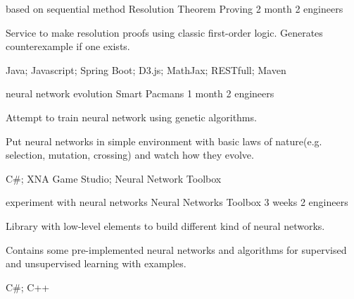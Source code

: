 \begin{cventries}
  \cventry
    {based on sequential method}
    {Resolution Theorem Proving}
    {2 month}
    {2 engineers}
    {
      \begin{cvitems}
        \item {Service to make resolution proofs using classic first-order logic. Generates counterexample if one exists.}
        \item {Java; Javascript; Spring Boot; D3.js; MathJax; RESTfull; Maven}
      \end{cvitems}
    }
  \cventry
    {neural network evolution}
    {Smart Pacmans}
    {1 month}
    {2 engineers}
    {
      \begin{cvitems}
        \item {Attempt to train neural network using genetic algorithms.}
        \item {Put neural networks in simple environment with basic laws of nature(e.g. selection, mutation, crossing) and watch how they evolve.}
        \item {C\#; XNA Game Studio; Neural Network Toolbox}
      \end{cvitems}
    }
  \cventry
    {experiment with neural networks}
    {Neural Networks Toolbox}
    {3 weeks}
    {2 engineers}
    {
      \begin{cvitems}
        \item {Library with low-level elements to build different kind of neural networks.}
        \item {Contains some pre-implemented neural networks and algorithms for supervised and unsupervised learning with examples.}
        \item {C\#; C++}
      \end{cvitems}
    }
\end{cventries}

